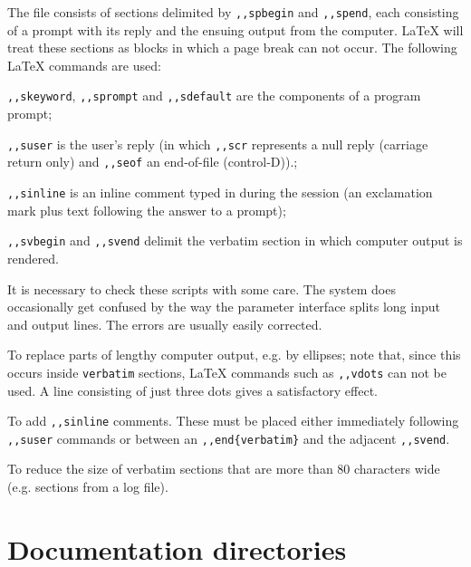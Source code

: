         The file consists of sections delimited by \verb/,,spbegin/ and 
\verb/,,spend/, each consisting of a prompt with its reply and the ensuing
output from the computer. LaTeX will treat these sections as blocks in which a
page break can not occur. The following LaTeX commands are used: 

\bi 

\item   \verb/,,skeyword/, \verb/,,sprompt/ and \verb/,,sdefault/ are the
components of a program prompt; 

\item   \verb/,,suser/ is the user's reply (in which \verb/,,scr/ represents a
null reply (carriage return only) and \verb/,,seof/ an end-of-file
(control-D)).; 

\item   \verb/,,sinline/ is an inline comment typed in during the session (an
exclamation mark plus text following the answer to a prompt); 

\item   \verb/,,svbegin/ and \verb/,,svend/ delimit the verbatim section in
which computer output is rendered. 

\ei 

        It is necessary to check these scripts with some care. The system does
occasionally get confused by the way the parameter interface splits long input
and output lines. The errors are usually easily corrected. 

\bi 

\item   To replace parts of lengthy computer output, e.g. by ellipses; note
that, since this occurs inside \verb/verbatim/ sections, LaTeX commands such as 
\verb/,,vdots/ can not be used. A line consisting of just three dots gives a
satisfactory effect. 

\item   To add \verb/,,sinline/ comments. These must be placed either
immediately following \verb/,,suser/ commands or between an 
\verb/,,end{verbatim}/ and the adjacent \verb/,,svend/. 

\item   To reduce the size of verbatim sections that are more than 80
characters wide (e.g. sections from a log file). 

\ei 


\section {Documentation directories} 

